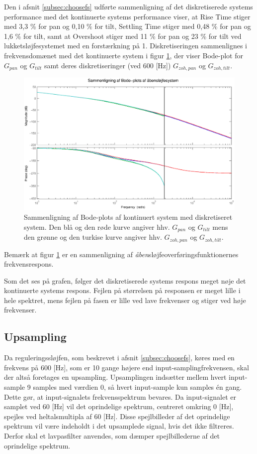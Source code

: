 Den i afsnit \ref{subsec:choosefs} udførte sammenligning af det diskretiserede systems performance
med det kontinuerte systems performance viser,
at Rise Time stiger med 3,3 \% for pan og 0,10 \% for tilt,
Settling Time stiger med 0,48 \% for pan og 1,6 \% for tilt,
samt at Overshoot stiger med 11 \% for pan og 23 \% for tilt
ved lukketsløjfesystemet med en forstærkning på 1.
Diskretiseringen sammenlignes i frekvensdomænet med det kontinuerte system
i figur \ref{fig:diskretBode}, der viser Bode-plot for \(G_{pan}\) og \(G_{tilt}\) samt
deres diskretiseringer (ved 600 [Hz]) \(G_{zoh,pan}\) og \(G_{zoh,tilt}\).
\begin{figure}[!th]
\centering
	\includegraphics[width=1\textwidth]{./graphics/diskretBode.eps}
\caption[Sammenligning af Bode-plots af kontinuert system med diskretiseret system]
{Sammenligning af Bode-plots af kontinuert system med diskretiseret system.
Den blå og den røde kurve angiver hhv. \(G_{pan}\) og \(G_{tilt}\) mens
den grønne og den turkise kurve angiver hhv. \(G_{zoh,pan}\) og \(G_{zoh,tilt}\).
}
\label{fig:diskretBode}
\end{figure}
Bemærk at figur \ref{fig:diskretBode} er en sammenligning af \textit{åben}sløjfeoverføringsfunktionernes
frekvensrespons.

Som det ses på grafen, følger det diskretiserede systems respons meget nøje det kontinuerte systems respons.
Fejlen på størrelsen på responsen er meget lille i hele spektret,
mens fejlen på fasen er lille ved lave frekvenser og stiger ved høje frekvenser.

\subsection{Upsampling}
Da reguleringssløjfen, som beskrevet i afsnit \ref{subsec:choosefs}, køres med en frekvens på 600 [Hz],
som er 10 gange højere end input-samplingfrekvensen, skal der altså foretages en upsampling.
Upsamplingen indsætter mellem hvert input-sample 9 samples med værdien 0, så hvert input-sample
kun samples én gang. Dette gør, at input-signalets frekvensspektrum bevares.
Da input-signalet er samplet ved 60 [Hz] vil det oprindelige spektrum, centreret omkring 0 [Hz],
spejles ved heltalsmultipla af 60 [Hz]. Disse spejlbilleder af det oprindelige spektrum vil være
indeholdt i det upsamplede signal, hvis det ikke filtreres. Derfor skal et lavpasfilter anvendes,
som dæmper spejlbillederne af det oprindelige spektrum.

